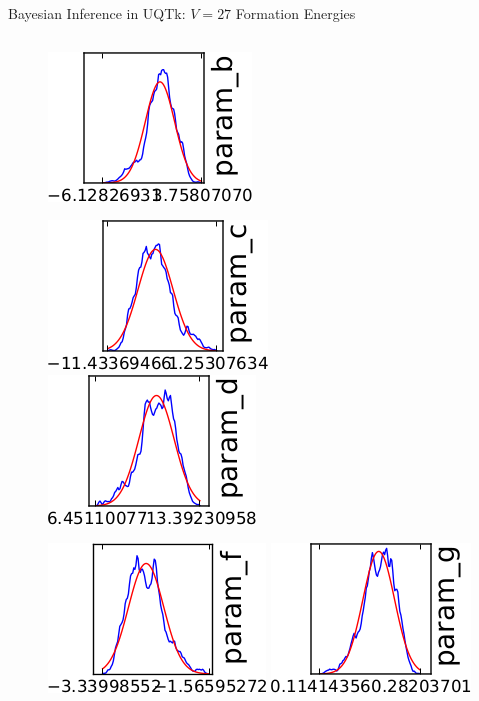 \documentclass[10pt]{beamer}
\begin{document}
\begin{frame}{Bayesian Inference in UQTk: $V = 27$ Formation Energies}
\begin{columns}[onlytextwith]
\begin{column}{0.5\textwidth}
\begin{figure}
        		\hspace{0.1in}
        		\includegraphics[height=0.2\textheight]{posterior_b}
      		\end{figure}
      		
      		\begin{figure}
        		\includegraphics[height=0.2\textheight]{posterior_c}
        		\hspace{0.1in}
        		\includegraphics[height=0.2\textheight]{posterior_d}
      		\end{figure}
      		
      		\begin{figure}
        		\includegraphics[height=0.2\textheight]{posterior_f}
        		\hspace{0.1in}
        		\includegraphics[height=0.2\textheight]{posterior_g}
      		\end{figure}
    	\end{column}
  	\end{columns}
\end{frame}
\end{document}
